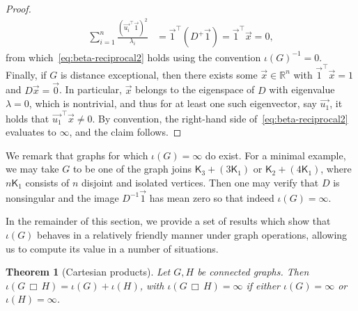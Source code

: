\documentclass[11pt,a4paper]{article}
\newcommand{\distmatrix}{D}
\newcommand{\x}{\vec{x}}
\newcommand{\one}{\vec{1}}
\newcommand{\Complete}{\mathsf{K}}
\newtheorem{theorem}{Theorem}[section]
\begin{document}
\begin{proof}
            \begin{align*}
                \sum_{i=1}^{n} \frac{(\vec{u_i}^\top \one)^2}{\lambda_i} &= \one^\top (\distmatrix^+\one) = \one^\top\x = 0,
            \end{align*}
        from which~\cref{eq:beta-reciprocal2} holds using the convention $\iota(G)^{-1} = 0$. Finally, if $G$ is distance exceptional, then there exists some $\x\in\mathbb{R}^{n}$ with $\one^\top\x = 1$ and $\distmatrix\x = \vec{0}$. In particular, $\x$ belongs to the eigenspace of $\distmatrix$ with eigenvalue $\lambda=0$, which is nontrivial, and thus for at least one such eigenvector, say $\vec{u_1}$, it holds that $\vec{u_1}^\top\x \neq 0$. By convention, the right-hand side of~\cref{eq:beta-reciprocal2} evaluates to $\infty$, and the claim follows.
    \end{proof}

    We remark that graphs for which $\iota(G) = \infty$ do exist. For a minimal example, we may take $G$ to be one of the graph joins $\Complete_3 + (3\Complete_1)$ or $\Complete_2 + (4\Complete_1)$, where $n\Complete_1$ consists of $n$ disjoint and isolated vertices. Then one may verify that $\distmatrix$ is nonsingular and the image $\distmatrix^{-1}\one$ has mean zero so that indeed $\iota(G) = \infty$.

    In the remainder of this section, we provide a set of results which show that $\iota(G)$ behaves in a relatively friendly manner under graph operations, allowing us to compute its value in a number of situations.

    \begin{theorem}[Cartesian products]\label{thm:index-product}
        Let $G, H$ be connected graphs. Then $\iota(G\,\Box\,H) = \iota(G) + \iota(H)$, with $\iota(G\,\Box\,H) = \infty$ if either $\iota(G) = \infty$ or $\iota(H) = \infty$.
    \end{theorem}
    
\end{document}
